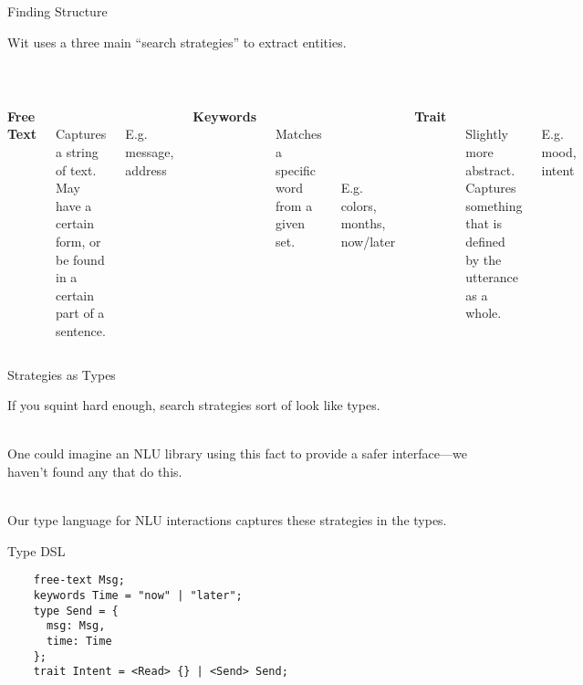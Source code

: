 \documentclass[10pt]{beamer}
\begin{document}
\begin{frame}[fragile]{Finding Structure}

  Wit uses a three main ``search strategies'' to extract entities.

  ~\\
  \begin{columns}[T,onlytextwidth]
    {\bf Free Text}

    ~\\
    Captures a string of text. May have a certain form, or be found in a certain
    part of a sentence.

    ~\\
    E.g. message, address

    {\bf Keywords}

    ~\\
    Matches a specific word from a given set.

    ~\\~\\~\\~\\
    E.g. colors, months, now/later

    {\bf Trait}

    ~\\
    Slightly more abstract. Captures something that is defined by the utterance
    as a whole.

    ~\\
    E.g. mood, intent
  \end{columns}
\end{frame}

\begin{frame}[fragile]{Strategies as Types}

  If you squint hard enough, search strategies sort of look like types.

  ~\\
  One could imagine an NLU library using this fact to provide a safer
  interface---we haven't found any that do this.

  ~\\
  Our type language for NLU interactions captures these strategies in the types.
\end{frame}

\begin{frame}[fragile]{Type DSL}

  \begin{center}
    \begin{verbatim}
    free-text Msg;
    keywords Time = "now" | "later";
    type Send = {
      msg: Msg,
      time: Time
    };
    trait Intent = <Read> {} | <Send> Send;
    \end{verbatim}
  \end{center}
\end{frame}
\end{document}
